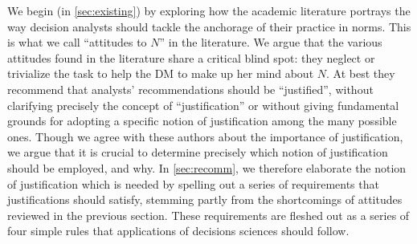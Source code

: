\documentclass[preprint, french, english, 11pt, authoryear]{elsarticle}%
\newcommand{\adv}{\mathscr{N}}
\begin{document}
\begin{changebar}
We begin (in \cref{sec:existing}) by exploring how the academic literature portrays the way decision analysts should tackle the anchorage of their practice in norms. This is what we call ``attitudes to $N$'' in the literature. %
We argue that the various attitudes found in the literature share a critical blind spot: they neglect or trivialize the task to help the \ac{DM} to make up her mind about $N$. At best they recommend that analysts' recommendations should be ``justified'', without clarifying precisely the concept of ``justification'' or without giving fundamental grounds for adopting a specific notion of justification among the many possible ones.
Though we agree with these authors about the importance of justification, we argue that it is crucial to determine precisely which notion of justification should be employed, and why. 
In \cref{sec:recomm}, we therefore elaborate the notion of justification which is needed by spelling out a series of requirements that justifications should satisfy, stemming partly from the shortcomings of attitudes reviewed in the previous section.
These requirements are fleshed out as a series of four simple rules that applications of decisions sciences should follow.%


\end{changebar}
\end{document}

